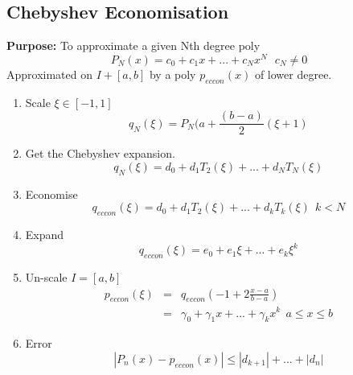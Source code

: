 \subsection*{Chebyshev Economisation}
\textbf{Purpose:} To approximate a given Nth degree poly
\[
P_{N}(x) = c_0 + c_1 x +...+c_Nx^N \ \ \ c_N\not=0
\]
Approximated on $I+[a,b]$ by a poly $p_{eccon}(x)$ of lower degree.

\begin{enumerate}
\item
Scale $\xi \in [-1,1]$
\[q_{N}(\xi) = P_N(a+\frac{(b-a)}{2}(\xi+1) \]
\item
Get the Chebyshev expansion.
\[q_{N}(\xi) = d_0 + d_1 T_2(\xi) +...+d_NT_{N}(\xi) 
\]
\item
Economise
\[q_{eccon}(\xi) = d_0 + d_1 T_2(\xi) +...+d_kT_{k}(\xi)  \ \ k< N
\]
\item
Expand
\[q_{eccon}(\xi) = e_0 + e_1 \xi +...+e_k\xi^k  
\]
\item
Un-scale $I=[a,b]$
\begin{eqnarray*}
p_{eccon}(\xi) & =&q_{eccon}(-1+2\frac{x-a}{b-a})  \\
&=& \gamma_0 + \gamma_1 x +...+\gamma_kx^k  \ \ a \leq x \leq b
\end{eqnarray*}
\item
Error
\[
|P_{n}(x)-p_{eccon}(x)| \leq |d_{k+1}|+ ...+|d_n| \]
\end{enumerate}

